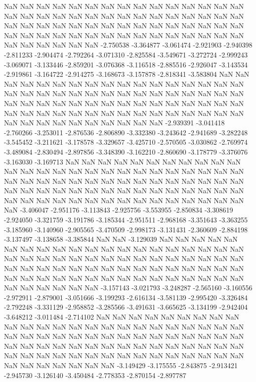 NaN
NaN
NaN
NaN
NaN
NaN
NaN
NaN
NaN
NaN
NaN
NaN
NaN
NaN
NaN
NaN
NaN
NaN
NaN
NaN
NaN
NaN
NaN
NaN
NaN
NaN
NaN
NaN
NaN
NaN
NaN
NaN
NaN
NaN
NaN
NaN
NaN
NaN
NaN
NaN
NaN
NaN
NaN
NaN
NaN
NaN
NaN
NaN
NaN
NaN
NaN
NaN
NaN
NaN
NaN
NaN
NaN
NaN
NaN
NaN
NaN
NaN
NaN
NaN
NaN
NaN
-2.750538
-3.364877
-3.061474
-2.921903
-2.940398
-2.811233
-2.904474
-2.792264
-3.071310
-2.825584
-3.549671
-3.272724
-2.999243
-3.069071
-3.133446
-2.859201
-3.076368
-3.116518
-2.885516
-2.926047
-3.143534
-2.919861
-3.164722
-2.914275
-3.168673
-3.157878
-2.818341
-3.583804
NaN
NaN
NaN
NaN
NaN
NaN
NaN
NaN
NaN
NaN
NaN
NaN
NaN
NaN
NaN
NaN
NaN
NaN
NaN
NaN
NaN
NaN
NaN
NaN
NaN
NaN
NaN
NaN
NaN
NaN
NaN
NaN
NaN
NaN
NaN
NaN
NaN
NaN
NaN
NaN
NaN
NaN
NaN
NaN
NaN
NaN
NaN
NaN
NaN
NaN
NaN
NaN
NaN
NaN
NaN
NaN
NaN
NaN
NaN
NaN
NaN
NaN
NaN
NaN
NaN
NaN
NaN
NaN
NaN
NaN
NaN
NaN
-2.939391
-3.041418
-2.760266
-3.253011
-2.876536
-2.806890
-3.332380
-3.243642
-2.941689
-3.282248
-3.545452
-3.211621
-3.178578
-3.329657
-3.425710
-2.570505
-3.030862
-2.769974
-3.489084
-2.830494
-2.897856
-3.348390
-3.162210
-2.860690
-3.178779
-3.376076
-3.163030
-3.169713
NaN
NaN
NaN
NaN
NaN
NaN
NaN
NaN
NaN
NaN
NaN
NaN
NaN
NaN
NaN
NaN
NaN
NaN
NaN
NaN
NaN
NaN
NaN
NaN
NaN
NaN
NaN
NaN
NaN
NaN
NaN
NaN
NaN
NaN
NaN
NaN
NaN
NaN
NaN
NaN
NaN
NaN
NaN
NaN
NaN
NaN
NaN
NaN
NaN
NaN
NaN
NaN
NaN
NaN
NaN
NaN
NaN
NaN
NaN
NaN
NaN
NaN
NaN
NaN
NaN
NaN
NaN
NaN
NaN
NaN
NaN
NaN
-3.406047
-2.951176
-3.113843
-2.925756
-3.553955
-2.850834
-3.308619
-2.924050
-3.321759
-3.191786
-3.185344
-2.951511
-2.968168
-3.351643
-3.363255
-3.185960
-3.140960
-2.905565
-3.470509
-2.998173
-3.131431
-2.360609
-2.884198
-3.137497
-3.138658
-3.385844
NaN
NaN
-3.129039
NaN
NaN
NaN
NaN
NaN
NaN
NaN
NaN
NaN
NaN
NaN
NaN
NaN
NaN
NaN
NaN
NaN
NaN
NaN
NaN
NaN
NaN
NaN
NaN
NaN
NaN
NaN
NaN
NaN
NaN
NaN
NaN
NaN
NaN
NaN
NaN
NaN
NaN
NaN
NaN
NaN
NaN
NaN
NaN
NaN
NaN
NaN
NaN
NaN
NaN
NaN
NaN
NaN
NaN
NaN
NaN
NaN
NaN
NaN
NaN
NaN
NaN
NaN
NaN
NaN
NaN
NaN
NaN
NaN
NaN
NaN
-3.157143
-3.021793
-3.248287
-2.565160
-3.160556
-2.972911
-2.879001
-3.051666
-3.199293
-2.616134
-3.581139
-2.995420
-3.326484
-2.792248
-3.331129
-2.958852
-3.285566
-3.491631
-3.665625
-3.134199
-2.942404
-3.648212
-3.011484
-2.714102
NaN
NaN
NaN
NaN
NaN
NaN
NaN
NaN
NaN
NaN
NaN
NaN
NaN
NaN
NaN
NaN
NaN
NaN
NaN
NaN
NaN
NaN
NaN
NaN
NaN
NaN
NaN
NaN
NaN
NaN
NaN
NaN
NaN
NaN
NaN
NaN
NaN
NaN
NaN
NaN
NaN
NaN
NaN
NaN
NaN
NaN
NaN
NaN
NaN
NaN
NaN
NaN
NaN
NaN
NaN
NaN
NaN
NaN
NaN
NaN
NaN
NaN
NaN
NaN
NaN
NaN
NaN
NaN
NaN
NaN
NaN
NaN
NaN
NaN
NaN
NaN
-3.149429
-3.175555
-2.843875
-2.913421
-2.945730
-3.126140
-3.450484
-2.778353
-2.870154
-2.897787
